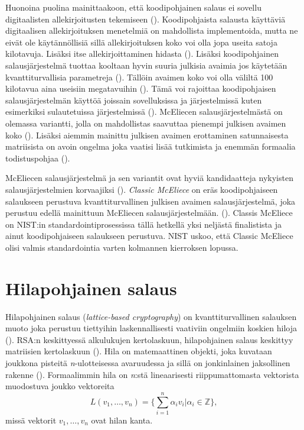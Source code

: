 Huonoina puolina mainittaakoon, että koodipohjainen salaus ei sovellu digitaalisten allekirjoitusten tekemiseen (\cite{8012331}). Koodipohjaista salausta käyttäviä digitaalisen allekirjoituksen menetelmiä on mahdollista implementoida, mutta ne eivät ole käytännöllisiä sillä allekirjoituksen koko voi olla jopa useita satoja kilotavuja. Lisäksi itse allekirjoittaminen hidasta (\cite{buchmann2016post}). Lisäksi koodipohjainen salausjärjestelmä tuottaa kooltaan hyvin suuria julkisia avaimia jos käytetään kvanttiturvallisia parametreja (\cite{8012331}). Tällöin avaimen koko voi olla väliltä 100 kilotavua aina useisiin megatavuihin (\cite{mavroeidis2018impact}). Tämä voi rajoittaa koodipohjaisen salausjärjestelmän käyttöä joissain sovelluksissa ja järjestelmissä kuten esimerkiksi sulautetuissa järjestelmissä (\cite{repka2014overview}). McEliecen salausjärjestelmästä on olemassa variantti, jolla on mahdollistas saavuttaa pienempi julkisen avaimen koko (\cite{buchmann2016post}). Lisäksi aiemmin mainittu julkisen avaimen erottaminen satunnaisesta matriisista on avoin ongelma joka vaatisi lisää tutkimista ja enemmän formaalia todistuspohjaa (\cite{8012331}).

McEliecen salausjärjestelmä ja sen variantit ovat hyviä kandidaatteja nykyisten salausjärjestelmien korvaajiksi (\cite{8012331}). \emph{Classic McEliece} on eräs koodipohjaiseen salaukseen perustuva kvanttiturvallinen julkisen avaimen salausjärjestelmä, joka perustuu edellä mainittuun McEliecen salausjärjestelmään. (\cite{alagic2020status}). Classis McEliece on NIST:in standardointiprosessissa tällä hetkellä yksi neljästä finalistista ja ainut koodipohjaiseen salaukseen perustuva. NIST uskoo, että Classic McEliece olisi valmis standardointia varten kolmannen kierroksen lopussa.

\section{Hilapohjainen salaus}
Hilapohjainen salaus (\emph{lattice-based cryptography}) on kvanttiturvallinen salauksen muoto joka perustuu tiettyihin laskennallisesti vaativiin ongelmiin koskien hiloja (\cite{regev2006lattice}). RSA:n keskittyessä alkulukujen kertolaskuun, hilapohjainen salaus keskittyy matriisien kertolaskuun (\cite{mavroeidis2018impact}). Hila on matemaattinen objekti, joka kuvataan joukkona pisteitä \emph{n}-ulotteisessa avaruudessa ja sillä on jonkinlainen jaksollinen rakenne (\cite{regev2006lattice}). Formaalimmin hila on \emph{n}:stä lineaarisesti riippumattomasta vektorista muodostuva joukko vektoreita 
\[L(v_1, \ldots ,v_n) =\Bigg\{ {\sum_{i=1}^{n}\alpha_i 
v_i|\alpha_i \in \mathbb{Z}} \Bigg\},\]
missä vektorit $v_1, \ldots ,v_n$ ovat hilan kanta.

